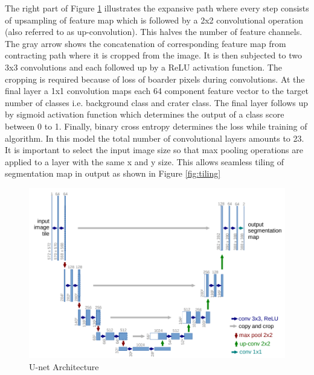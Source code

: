 \documentclass[11pt]{article}
\begin{document}
The right part of Figure \ref{fig:U-net} illustrates the expansive path where every step consists of upsampling of feature map which is followed by a 2x2 convolutional operation (also referred to as up-convolution). This halves the number of feature channels. The gray arrow shows the concatenation of corresponding feature map from contracting path where it is cropped from the image. It is then subjected to two 3x3 convolutions and each followed up by a ReLU activation function. The cropping is required because of loss of boarder pixels during convolutions. At the final layer a 1x1 convolution maps each 64 component feature vector to the target number of classes i.e. background class and crater class. The final layer follows up by sigmoid activation function which determines the output of a class score between 0 to 1. Finally, binary cross entropy determines the loss while training of algorithm. In this model the total number of convolutional layers amounts to 23. It is important to select the input image size so that max pooling operations are applied to a layer with the same x and y size. This allows seamless tiling of segmentation map in output as shown in Figure \ref{fig:tiling}



\begin{figure}[H]
	\includegraphics[width=\linewidth]{files/unet/arch.png}
	\caption{U-net Architecture}
	\label{fig:U-net}
\end{figure} 
\end{document}

